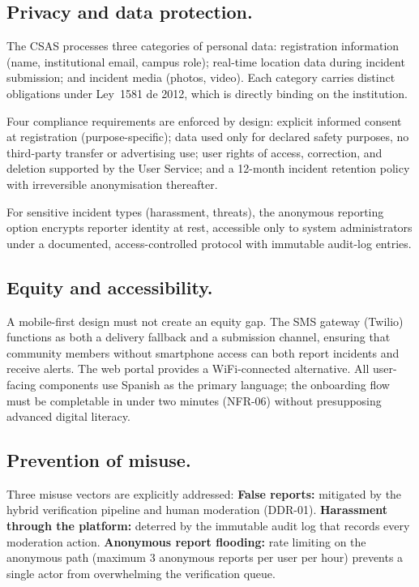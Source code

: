 \documentclass[12pt,a4paper]{article}
\begin{document}
\subsection{Privacy and data protection.}
The CSAS processes three categories of personal data: registration
information (name, institutional email, campus role); real-time
location data during incident submission; and incident media (photos,
video). Each category carries distinct obligations under Ley~1581 de
2012, which is directly binding on the institution.

Four compliance requirements are enforced by design: explicit informed
consent at registration (purpose-specific); data used only for
declared safety purposes, no third-party transfer or advertising use;
user rights of access, correction, and deletion supported by the User
Service; and a 12-month incident retention policy with irreversible
anonymisation thereafter.

For sensitive incident types (harassment, threats), the anonymous
reporting option encrypts reporter identity at rest, accessible only
to system administrators under a documented, access-controlled
protocol with immutable audit-log entries.

\subsection{Equity and accessibility.}
A mobile-first design must not create an equity gap. The SMS gateway
(Twilio) functions as both a delivery fallback and a submission
channel, ensuring that community members without smartphone access
can both report incidents and receive alerts. The web portal provides
a WiFi-connected alternative. All user-facing components use Spanish
as the primary language; the onboarding flow must be completable in
under two minutes (NFR-06) without presupposing advanced digital
literacy.

\subsection{Prevention of misuse.}
Three misuse vectors are explicitly addressed:
\textbf{False reports:} mitigated by the hybrid verification pipeline
and human moderation (DDR-01).
\textbf{Harassment through the platform:} deterred by the immutable
audit log that records every moderation action.
\textbf{Anonymous report flooding:} rate limiting on the anonymous
path (maximum 3 anonymous reports per user per hour) prevents a
single actor from overwhelming the verification queue.
\end{document}
